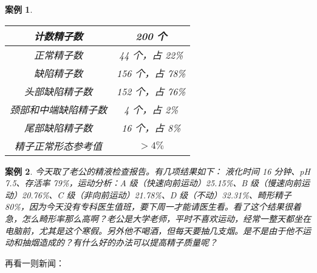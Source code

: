 \documentclass{ctexart}
\newtheorem{case}{案例}
\begin{document}
\begin{case}
\begin{enumerate}
\begin{center}
\begin{tabular}{c|c}
                计数精子数      & 200 个        \\ \hline
                正常精子数      & 44 个，占 22\%  \\ \hline
                缺陷精子数      & 156 个，占 78\% \\ \hline
                头部缺陷精子数    & 152 个，占 76\% \\ \hline
                颈部和中端缺陷精子数 & 4 个，占 2\%    \\ \hline
                尾部缺陷精子数    & 16 个，占 8\%   \\ \hline
                精子正常形态参考值  & $> 4 \%$
            \end{tabular}
        \end{center}
    \end{enumerate}
\end{case}

\begin{case}
    今天取了老公的精液检查报告。有几项结果如下： 液化时间 16 分钟、pH 7.5、存活率 79\%，运动分析：A 级（快速向前运动）25.15\%、B 级（慢速向前运动）20.76\%、C 级（非向前运动）21.78\%、D 级（不动）32.31\%、畸形精子 80\%，因为今天没有专科医生值班，要下周一才能请医生看。看了这个结果很着急，怎么畸形率那么高啊？老公是大学老师，平时不喜欢运动，经常一整天都坐在电脑前，尤其是这个寒假。另外他不喝酒，但每天要抽几支烟。是不是由于他不运动和抽烟造成的？有什么好的办法可以提高精子质量呢？
\end{case}

再看一则新闻：
\end{document}
